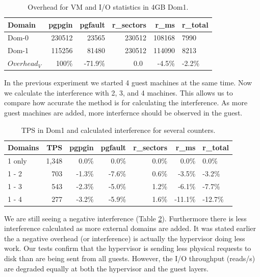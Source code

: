 \begin{table}[h]
\begin{tabular}{ l r r r r p{5cm} }
    Domain &  pgpgin &   pgfault & r\_sectors & r\_ms & r\_total \\
    \hline
    Dom-0  &  230512 &   23565   & 230512   & 108168 &  7990 \\
    Dom-1  &  115256 &   81480   & 230512   & 114090 &  8213 \\
$Overhead_V$ & 100\% &   -71.9\% & 0.0\	    & -4.5\%  & -2.2\% \\
    \hline
\end{tabular}
\caption{Overhead for VM and I/O statistics in 4GB Dom1.}
\label{fig:OverheadMed}
\end{table}

In the previous experiment we started 4 guest machines at the same time.  Now we calculate the interference with 2, 3, and 4 machines.   This allows us to compare how accurate the method is for calculating the interference.  As more guest machines are added, more interfernce should be observed in the guest. 

\begin{table}[h]
\begin{tabular}{ l r r r r r p{5cm} }
    Domains &  TPS & pgpgin &   pgfault & r\_sectors & r\_ms & r\_total \\
    \hline
    1 only & 1,348 & 0.0\%  &    0.0\%  &  0.0\%     &  0.0\% &   0.0\%  \\
    1 - 2  &  703  & -1.3\% &	-7.6\%  &  0.6\%     &  -3.5\% &  -3.2\%  \\
    1 - 3  &  543  & -2.3\% & 	-5.0\%  &  1.2\%     &  -6.1\% &  -7.7\%  \\
    1 - 4  &  277  & -3.2\% &   -5.9\%  &  1.6\%     & -11.1\% &  -12.7\% \\
    \hline
\end{tabular}
\caption{TPS in Dom1 and calculated interference for several counters.}
\label{fig:InterferenceMed}
\end{table}

We are still seeing a negative interference (Table \ref{fig:InterferenceMed}).  Furthermore there is less interference calculated as more external domains are added.  
It was stated earlier the a negative overhead (or interference) is actually the hypervisor doing less work.  
Our tests confirm that the hypervisor is sending less physical requests to disk than are being sent from all guests.  
However, the I/O throughput (reads/s) are degraded equally at both the hypervisor and the guest layers.  

